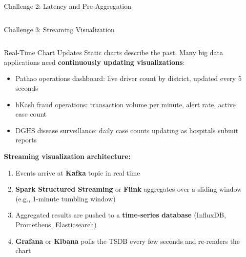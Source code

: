 \documentclass[aspectratio=169,10pt]{beamer}
\begin{document}
\begin{frame}{Challenge 2: Latency and Pre-Aggregation}
\begin{columns}[T]
\begin{center}
      \end{center}
  \end{columns}
\end{frame}

\begin{frame}{Challenge 3: Streaming Visualization}
  \begin{columns}[T]
      \begin{block}{Real-Time Chart Updates}
        Static charts describe the past.  Many big data applications need \textbf{continuously updating visualizations}:
        \begin{itemize}
          \item Pathao operations dashboard: live driver count by district, updated every 5 seconds
          \item bKash fraud operations: transaction volume per minute, alert rate, active case count
          \item DGHS disease surveillance: daily case counts updating as hospitals submit reports
        \end{itemize}
        \vspace{4pt}
        \textbf{Streaming visualization architecture:}
        \begin{enumerate}
          \item Events arrive at \textbf{Kafka} topic in real time
          \item \textbf{Spark Structured Streaming} or \textbf{Flink} aggregates over a sliding window (e.g., 1-minute tumbling window)
          \item Aggregated results are pushed to a \textbf{time-series database} (InfluxDB, Prometheus, Elasticsearch)
          \item \textbf{Grafana} or \textbf{Kibana} polls the TSDB every few seconds and re-renders the chart
        \end{enumerate}
      \end{block}


\end{columns}
\end{frame}
\end{document}
